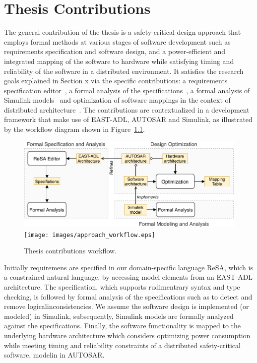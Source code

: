 \chapter{Thesis Contributions}
	The general contribution of the thesis is a safety-critical design approach that employs formal methods at various stages of software development such as requirements specification and software design, and a power-efficient and integrated mapping of the software to hardware while satisfying timing and reliability of the software in a distributed environment. It satisfies the research goals explained in Section x via the specific contributions: a requirements specification editor~\cite{Mahmud2015ReSA:Systems}\cite{resatool}, a formal analysis of the specifications~\cite{resatool}\cite{Mahmud2017SpecificationLogic}, a formal analysis of Simulink models~\cite{Filipovikj2018SimppaalModels} and optimization of software mappings in the context of distributed architecture~\cite{Mahmud5222}\cite{Mahmud2019Power-awareOptimization}. The contributions are contextualized in a development framework that make use of EAST-ADL, AUTOSAR and Simulink, as illustrated by the workflow diagram shown in Figure~\ref{fig_workflow}.
\begin{figure}[h]
	\centering
	\ifpdf
	\includegraphics[width=\linewidth]{images/approach_workflow}
	\else
	\texttt{[image: images/approach\_workflow.eps]}
	\fi
	\caption{Thesis contributions workflow.} 
	\label{fig_workflow}
\end{figure}

Initially requiremens are specified in our domain-specific language ReSA, which is a constrained natural language, by accessing model elements from an EAST-ADL architecture. The specification, which supports rudimentrary syntax and type checking, is followed by formal analysis of the specifications such as to detect and remove logicalinconsistencies. We assume the software design is implemented (or modeled) in Simulink, subsequently, Simulink models are formally analyzed against the specifications. Finally, the software functionality is mapped to the underlying hardware architecture which considers optimizing power consumption while meeting timing and reliability constraints of a distributed safety-critical software, modelin in AUTOSAR.


